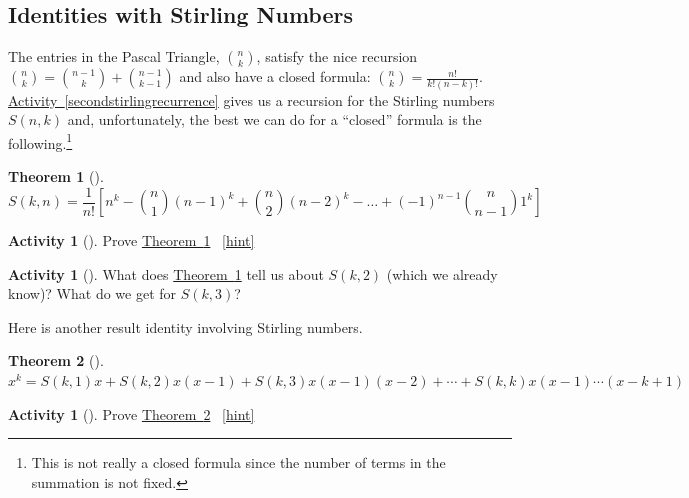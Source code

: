 \documentclass[10pt,]{book}
\theoremstyle{plain}
\newtheorem{theorem}{Theorem}[section]
\theoremstyle{definition}
\theoremstyle{definition}
\theoremstyle{definition}
\newtheorem{activity}[project]{Activity}
\numberwithin{equation}{chapter}
\begin{document}
\subsection[{Identities with Stirling Numbers}]{Identities with Stirling Numbers}\label{subsec-stirlingidentities}
\hypertarget{p-1443}{}%
The entries in the Pascal Triangle, \(\binom{n}{k}\), satisfy the nice recursion \(\binom{n}{k} = \binom{n - 1}{k} + \binom{n - 1}{k - 1}\) and also have a closed formula: \(\binom{n}{k} = \frac{n!}{k!(n - k)!}\). \hyperref[secondstirlingrecurrence]{Activity~\ref{secondstirlingrecurrence}} gives us a recursion for the Stirling numbers \(S(n,k)\) and, unfortunately, the best we can do for a ``closed'' formula is the following.\footnote{This is not really a closed formula since the number of terms in the summation is not fixed.\label{fn-19}}%
\begin{theorem}[{}]\label{thm-stirling-closed}
\hypertarget{p-1444}{}%
%
\begin{equation*}
S(k,n) = \frac{1}{n!}\left[n^{k} - \binom{n}{1} \left( n - 1 \right)^{k} + \binom{n}{2} \left( n - 2 \right)^{k} - \ldots + \left( - 1 \right)^{n - 1}\binom{n}{n - 1} 1^{k} \right] 
\end{equation*}
%
\end{theorem}
\begin{activity}[]\label{activity-278}
\hypertarget{p-1445}{}%
Prove \hyperref[thm-stirling-closed]{Theorem~\ref{thm-stirling-closed}}%
~\hfill{\tiny\hyperlink{a-285}{[hint]}\hypertarget{q-285}{}}\end{activity}
\begin{activity}[]\label{activity-279}
\hypertarget{p-1449}{}%
What does \hyperref[thm-stirling-closed]{Theorem~\ref{thm-stirling-closed}} tell us about \(S(k, 2)\) (which we already know)?  What do we get for \(S(k,3)\)?%
\end{activity}
\hypertarget{p-1451}{}%
Here is another result identity involving Stirling numbers.%
\begin{theorem}[{}]\label{thm-stirling-polynomial}
\hypertarget{p-1452}{}%
\(x^{k} = S\left(k,1 \right)x + S\left(k,2 \right)x\left( x - 1 \right) + S\left(k,3 \right)x\left( x - 1 \right)\left( x - 2 \right) + \cdots
+ S\left(k,k \right)x\left( x - 1 \right)\cdots(x -k + 1)\)%
\end{theorem}
\begin{activity}[]\label{activity-280}
\hypertarget{p-1453}{}%
Prove \hyperref[thm-stirling-polynomial]{Theorem~\ref{thm-stirling-polynomial}}%
~\hfill{\tiny\hyperlink{a-287}{[hint]}\hypertarget{q-287}{}}\end{activity}
\end{document}

